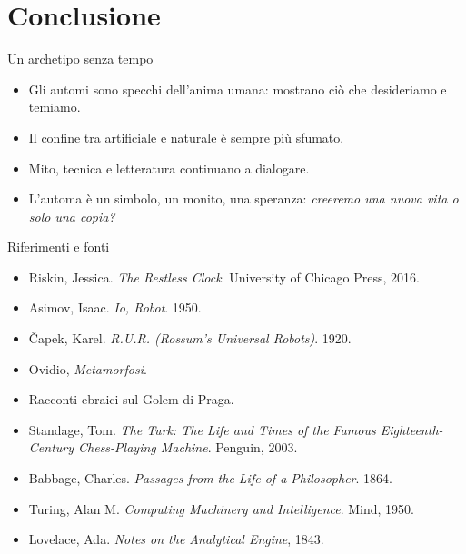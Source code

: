 \documentclass{beamer}
\begin{document}
\section{Conclusione}
%
%
\begin{frame}{Un archetipo senza tempo}
  \begin{itemize}
    \item Gli automi sono specchi dell’anima umana: mostrano ciò che desideriamo e temiamo.
    \item Il confine tra artificiale e naturale è sempre più sfumato.
    \item Mito, tecnica e letteratura continuano a dialogare.
    \item L’automa è un simbolo, un monito, una speranza: \textit{creeremo una nuova vita o solo una copia?}
  \end{itemize}
\end{frame}
%
\begin{frame}[allowframebreaks]{Riferimenti e fonti}
  \small
  \begin{itemize}
    \item Riskin, Jessica. \textit{The Restless Clock}. University of Chicago Press, 2016.
    \item Asimov, Isaac. \textit{Io, Robot}. 1950.
    \item Čapek, Karel. \textit{R.U.R. (Rossum's Universal Robots)}. 1920.
    \item Ovidio, \textit{Metamorfosi}.
    \item Racconti ebraici sul Golem di Praga.
    \item Standage, Tom. \textit{The Turk: The Life and Times of the Famous Eighteenth-Century Chess-Playing Machine}. Penguin, 2003.
    \item Babbage, Charles. \textit{Passages from the Life of a Philosopher}. 1864.
    \item Turing, Alan M. \textit{Computing Machinery and Intelligence}. Mind, 1950.
    \item Lovelace, Ada. \textit{Notes on the Analytical Engine}, 1843.
  \end{itemize}
\end{frame}
%
%
\end{document}

